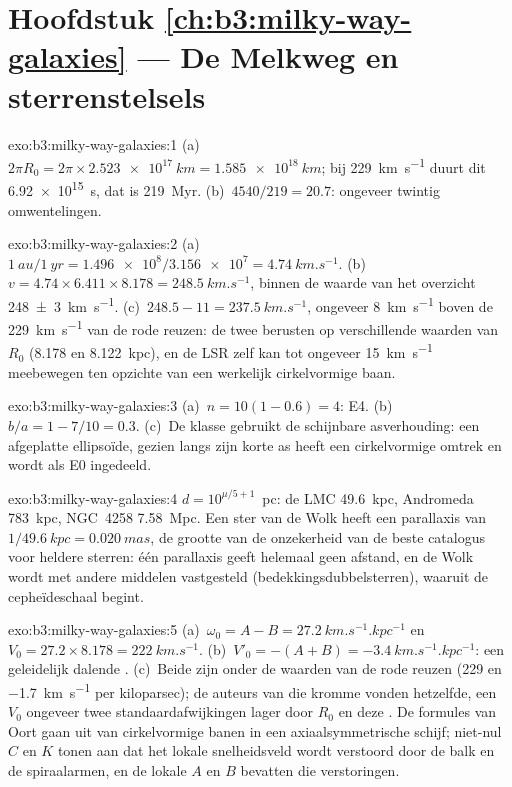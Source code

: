 \section*{Hoofdstuk \ref{ch:b3:milky-way-galaxies} --- De Melkweg en sterrenstelsels}

\begin{solution}{exo:b3:milky-way-galaxies:1}
(a)~$2\pi R_0 = 2\pi\times\qty{2.523e17}{km} = \qty{1.585e18}{km}$; bij
\qty{229}{km.s^{-1}} duurt dit \qty{6.92e15}{s}, dat is
\qty{219}{Myr}. (b)~$4540/219 = 20.7$: ongeveer twintig omwentelingen.
\end{solution}

\begin{solution}{exo:b3:milky-way-galaxies:2}
(a)~$\qty{1}{au}/\qty{1}{yr} = \num{1.496e8}/\num{3.156e7} =
\qty{4.74}{km.s^{-1}}$. (b)~$v = 4.74\times6.411\times8.178 =
\qty{248.5}{km.s^{-1}}$, binnen de waarde van het overzicht
\qty[separate-uncertainty=true]{248 \pm 3}{km.s^{-1}}. (c)~$248.5 - 11 = \qty{237.5}{km.s^{-1}}$,
ongeveer \qty{8}{km.s^{-1}} boven de \qty{229}{km.s^{-1}} van de rode reuzen:
de twee berusten op verschillende waarden van $R_0$ (8.178 en \qty{8.122}{kpc}),
en de LSR zelf kan tot ongeveer \qty{15}{km.s^{-1}} meebewegen ten opzichte van
een werkelijk cirkelvormige baan.
\end{solution}

\begin{solution}{exo:b3:milky-way-galaxies:3}
(a)~$n = 10(1 - 0.6) = 4$: E4. (b)~$b/a = 1 - 7/10 = 0.3$. (c)~De klasse
gebruikt de schijnbare asverhouding: een afgeplatte ellipsoïde, gezien langs zijn korte
as heeft een cirkelvormige omtrek en wordt als E0 ingedeeld.
\end{solution}

\begin{solution}{exo:b3:milky-way-galaxies:4}
$d = 10^{\mu/5 + 1}$~pc: de LMC \qty{49.6}{kpc}, Andromeda
\qty{783}{kpc}, NGC~4258 \qty{7.58}{Mpc}. Een ster van de Wolk heeft een
parallaxis van $1/\qty{49.6}{kpc} = \qty{0.020}{mas}$, de grootte van de
onzekerheid van de beste catalogus voor heldere sterren: één parallaxis geeft helemaal geen
afstand, en de Wolk wordt met andere middelen vastgesteld (bedekkingsdubbelsterren),
waaruit de cepheïdeschaal begint.
\end{solution}

\begin{solution}{exo:b3:milky-way-galaxies:5}
(a)~$\omega_0 = A - B = \qty{27.2}{km.s^{-1}.kpc^{-1}}$ en $V_0 =
27.2\times8.178 = \qty{222}{km.s^{-1}}$. (b)~$V'_0 = -(A + B) =
\qty{-3.4}{km.s^{-1}.kpc^{-1}}$: een geleidelijk dalende . (c)~Beide zijn
onder de waarden van de rode reuzen (229 en \qty{-1.7}{km.s^{-1}} per
kiloparsec); de auteurs van die kromme vonden hetzelfde, een $V_0$ ongeveer twee
standaardafwijkingen lager door $R_0$ en deze . De formules van Oort
gaan uit van cirkelvormige banen in een axiaalsymmetrische schijf; niet-nul $C$ en
$K$ tonen aan dat het lokale snelheidsveld wordt verstoord door de balk en de
spiraalarmen, en de lokale $A$ en $B$ bevatten die verstoringen.
\end{solution}


